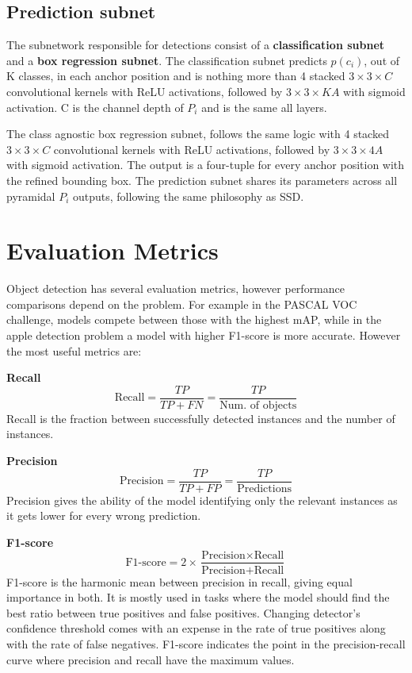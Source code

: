 \subsection{Prediction subnet}
The subnetwork responsible for detections consist of a \textbf{classification subnet} and a \textbf{box regression subnet}. The classification subnet predicts $p(c_i)$, out of K classes, in each anchor position and is nothing more than 4 stacked $3\times3\times C$ convolutional kernels with ReLU activations, followed by  $3\times3\times KA$ with sigmoid activation. C is the channel depth of $P_i$ and is the same all layers.

The class agnostic box regression subnet, follows the same logic with 4 stacked $3\times3\times C$ convolutional kernels with ReLU activations, followed by $3\times3\times 4A$ with sigmoid activation. The output is a four-tuple for every anchor position with the refined bounding box. The prediction subnet shares its parameters across all pyramidal $P_i$ outputs, following the same philosophy as SSD.

\section{Evaluation Metrics}
Object detection has several evaluation metrics, however performance comparisons depend on the problem. For example in the PASCAL VOC challenge, models compete between those with the highest mAP, while in the apple detection problem a model with higher F1-score is more accurate. However the most useful metrics are:

\bigskip
\textbf{Recall}
\bigskip\noindent
\begin{equation}
  \text{Recall} = \frac{TP}{TP+FN}=\frac{TP}{\text{Num. of objects}}
\end{equation} 
Recall is the fraction between successfully detected instances and the number of instances.

\bigskip
\textbf{Precision}
\bigskip\noindent
\begin{equation}
  \text{Precision} = \frac{TP}{TP+FP}=\frac{TP}{\text{Predictions}}
\end{equation} 
Precision gives the ability of the model identifying only the relevant instances as it gets lower for every wrong prediction.

\bigskip
\textbf{F1-score}
\bigskip\noindent
\begin{equation}
  \text{F1-score} = 2\times\frac{\text{Precision}\times \text{Recall}}{\text{Precision}+\text{Recall}}\end{equation} 
F1-score is the harmonic mean between precision in recall, giving equal importance in both. It is mostly used in tasks where the model should find the best ratio between true positives and false positives. Changing detector's confidence threshold comes with an expense in the rate of true positives along with the rate of false negatives. F1-score indicates the point in the precision-recall curve where precision and recall have the maximum values.

